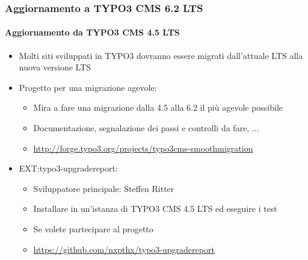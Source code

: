 
\begin{frame}[fragile]
	\frametitle{Aggiornamento a TYPO3 CMS 6.2 LTS}
	\framesubtitle{Aggiornamento da TYPO3 CMS 4.5 LTS}

	\begin{itemize}
		\item Molti siti sviluppati in TYPO3 dovranno essere migrati dall'attuale LTS alla nuova versione LTS
		\item Progetto per una migrazione agevole:

			\begin{itemize}
				\item Mira a fare una migrazione dalla 4.5 alla 6.2 il più agevole possibile
				\item Documentazione, segnalazione dei passi e controlli da fare, ...
				\item \smaller\url{http://forge.typo3.org/projects/typo3cms-smoothmigration}\normalsize
			\end{itemize}

		\item EXT:typo3-upgradereport:

			\begin{itemize}
				\item Sviluppatore principale: Steffen Ritter
				\item Installare in un'istanza di TYPO3 CMS 4.5 LTS ed eseguire i test
				\item Se volete partecipare al progetto
				\item \smaller\url{https://github.com/nxpthx/typo3-upgradereport}\normalsize
			\end{itemize}
	\end{itemize}

\end{frame}


